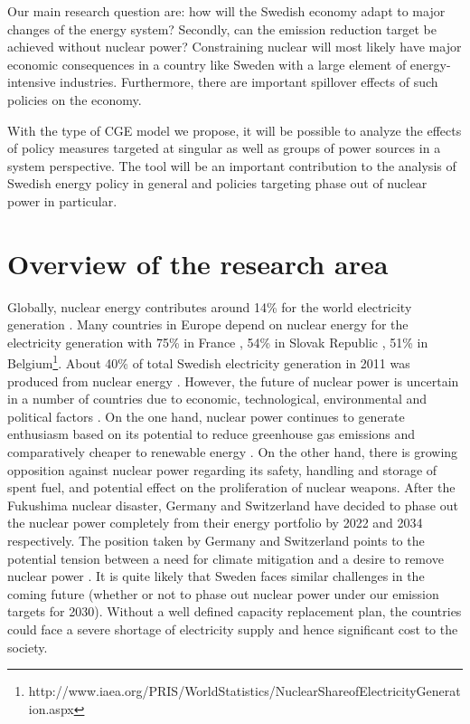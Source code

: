 Our main research question are: how will the Swedish economy adapt to major changes of the energy system? Secondly, can the emission reduction target be achieved without nuclear power? Constraining nuclear will most likely have major economic consequences in a country like Sweden with a large element of energy-intensive industries. Furthermore, there are important spillover effects of such policies on the economy.

With the type of CGE model we propose, it will be possible to analyze the effects of policy measures targeted at singular as well as groups of power sources in a system perspective. The tool will be an important contribution to the analysis of Swedish energy policy in general and policies targeting phase out of nuclear power in particular.

\section{Overview of the research area}
Globally, nuclear energy contributes around 14\% for the world electricity generation \citep{OECD2012}. Many countries in Europe depend on nuclear energy for the electricity generation with 75\% in France , 54\% in Slovak Republic , 51\% in Belgium\footnote{http://www.iaea.org/PRIS/WorldStatistics/NuclearShareofElectricityGeneration.aspx}. About 40\% of total Swedish electricity generation in 2011 was produced from nuclear energy \citep{SEA2012}. However, the future of nuclear power is uncertain in a number of countries due to economic, technological, environmental and political factors \citep{Joskow2012}. On the one hand, nuclear power continues to generate enthusiasm based on its potential to reduce greenhouse gas emissions and comparatively cheaper to renewable energy \citep{Davis2012, Renssen2013}. On the other hand, there is growing opposition against nuclear power regarding its safety, handling and storage of spent fuel, and potential effect on the proliferation of nuclear weapons. After the Fukushima nuclear disaster, Germany and Switzerland have decided to phase out the nuclear power completely from their energy portfolio by  2022 and 2034 respectively. The position taken by Germany and Switzerland points to the potential tension between a need for climate mitigation and a desire to remove nuclear power \citep{Glomsrod2013}. It is quite likely that Sweden faces similar challenges in the coming future (whether or not to phase out nuclear power under our emission targets for 2030). Without a well defined capacity replacement plan, the countries could face a severe shortage of electricity supply and hence significant cost to the society.

